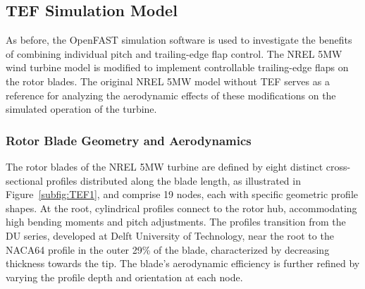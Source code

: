 \subsection{TEF Simulation Model} %
As before, the OpenFAST simulation software is used to investigate the benefits of combining individual pitch and trailing-edge flap control. The NREL 5MW wind turbine model is modified to implement controllable trailing-edge flaps on the rotor blades. The original NREL 5MW model without TEF serves as a reference for analyzing the aerodynamic effects of these modifications on the simulated operation of the turbine. 
\subsubsection*{Rotor Blade Geometry and Aerodynamics}
The rotor blades of the NREL 5MW turbine are defined by eight distinct cross-sectional profiles distributed along the blade length, as illustrated in Figure~\ref{subfig:TEF1}, and comprise 19 nodes, each with specific geometric profile shapes. At the root, cylindrical profiles connect to the rotor hub, accommodating high bending moments and pitch adjustments. The profiles transition from the DU series, developed at Delft University of Technology, near the root to the NACA64 profile in the outer 29\% of the blade, characterized by decreasing thickness towards the tip. The blade's aerodynamic efficiency is further refined by varying the profile depth and orientation at each node.

